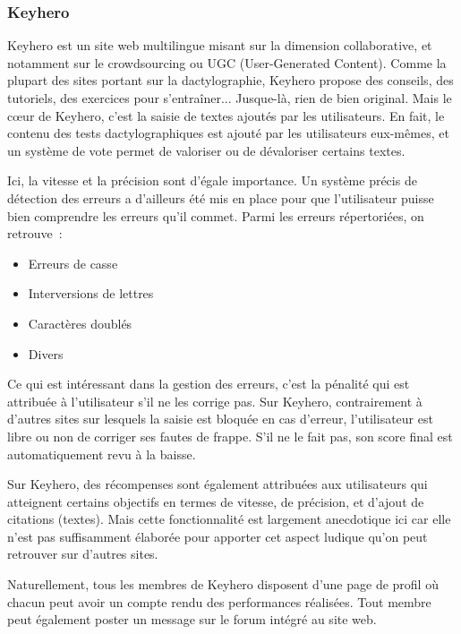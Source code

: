\documentclass[a4paper,12pt]{article}
\begin{document}
\newpage

\subsubsection{Keyhero}

Keyhero est un site web multilingue misant sur la dimension collaborative, et notamment sur le crowdsourcing ou UGC (User-Generated Content). Comme la plupart des sites portant sur la dactylographie, Keyhero propose des conseils, des tutoriels, des exercices pour s'entraîner... Jusque-là, rien de bien original. Mais le cœur de Keyhero, c'est la saisie de textes ajoutés par les utilisateurs. En fait, le contenu des tests dactylographiques est ajouté par les utilisateurs eux-mêmes, et un système de vote permet de valoriser ou de dévaloriser certains textes.

Ici, la vitesse et la précision sont d'égale importance. Un système précis de détection des erreurs a d'ailleurs été mis en place pour que l'utilisateur puisse bien comprendre les erreurs qu'il commet. Parmi les erreurs répertoriées, on retrouve~:

\begin{itemize}
 \item{Erreurs de casse}
 \item{Interversions de lettres}
 \item{Caractères doublés}
 \item{Divers}
\end{itemize}

Ce qui est intéressant dans la gestion des erreurs, c'est la pénalité qui est attribuée à l'utilisateur s'il ne les corrige pas. Sur Keyhero, contrairement à d'autres sites sur lesquels la saisie est bloquée en cas d'erreur, l'utilisateur est libre ou non de corriger ses fautes de frappe. S'il ne le fait pas, son score final est automatiquement revu à la baisse.

Sur Keyhero, des récompenses sont également attribuées aux utilisateurs qui atteignent certains objectifs en termes de vitesse, de précision, et d'ajout de citations (textes). Mais cette fonctionnalité est largement anecdotique ici car elle n'est pas suffisamment élaborée pour apporter cet aspect ludique qu'on peut retrouver sur d'autres sites.

Naturellement, tous les membres de Keyhero disposent d'une page de profil où chacun peut avoir un compte rendu des performances réalisées. Tout membre peut également poster un message sur le forum intégré au site web.
\end{document}
